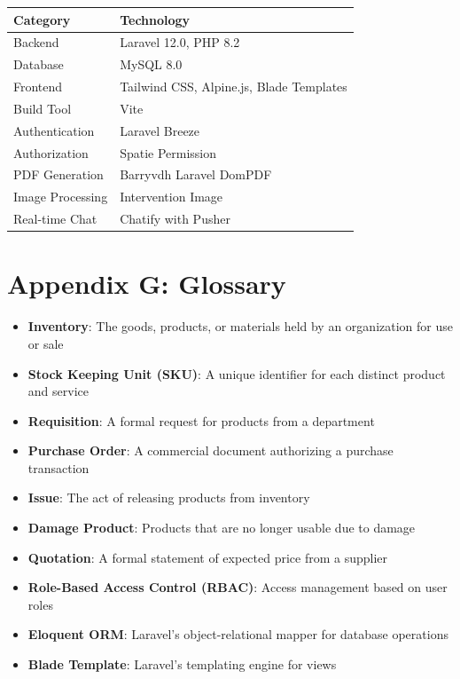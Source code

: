 \begin{table}[h]
\centering
\begin{tabular}{|p{2.5cm}|p{4cm}|}
\hline
\textbf{Category} & \textbf{Technology}\\
\hline
Backend & Laravel 12.0, PHP 8.2\\
\hline
Database & MySQL 8.0\\
\hline
Frontend & Tailwind CSS, Alpine.js, Blade Templates\\
\hline
Build Tool & Vite\\
\hline
Authentication & Laravel Breeze\\
\hline
Authorization & Spatie Permission\\
\hline
PDF Generation & Barryvdh Laravel DomPDF\\
\hline
Image Processing & Intervention Image\\
\hline
Real-time Chat & Chatify with Pusher\\
\hline
\end{tabular}
\end{table}

\section{Appendix G: Glossary}

\begin{itemize}
    \item \textbf{Inventory}: The goods, products, or materials held by an organization for use or sale
    \item \textbf{Stock Keeping Unit (SKU)}: A unique identifier for each distinct product and service
    \item \textbf{Requisition}: A formal request for products from a department
    \item \textbf{Purchase Order}: A commercial document authorizing a purchase transaction
    \item \textbf{Issue}: The act of releasing products from inventory
    \item \textbf{Damage Product}: Products that are no longer usable due to damage
    \item \textbf{Quotation}: A formal statement of expected price from a supplier
    \item \textbf{Role-Based Access Control (RBAC)}: Access management based on user roles
    \item \textbf{Eloquent ORM}: Laravel's object-relational mapper for database operations
    \item \textbf{Blade Template}: Laravel's templating engine for views
\end{itemize}